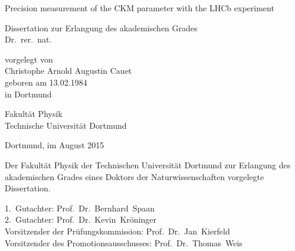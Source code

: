 
\begin{titlepage}

\vspace*{20ex}

{%
\Huge \sffamily \bfseries 
\begin{center}
  Precision measurement of the CKM parameter \sintwobetabfsf with the \acs*{LHCb} experiment
\end{center} 
}%

\begin{german}
{%
\LARGE \sffamily %
\begin{center}
  Dissertation zur Erlangung des akademischen Grades\\
  Dr.~rer.~nat.
\end{center}
}

\vspace{5ex}

{%
\Large \rmfamily
\begin{center}
  vorgelegt von \\ [0.8ex]
  Christophe Arnold Augustin Cauet \\ [0.8ex]
  geboren am 13.02.1984 \\
  in Dortmund
\end{center}
}

\vspace{5ex}

{%
\Large \rmfamily
\begin{center}
  Fakultät Physik\\
  Technische Universität Dortmund
\end{center}
}

\vspace{4ex}

{%
\Large \rmfamily
\begin{center}
  Dortmund, im August 2015
\end{center}
}

\clearpage
\thispagestyle{empty}
\vspace*{\fill}
{%
\small
  \noindent Der Fakultät Physik der Technischen Universität Dortmund zur Erlangung
  des aka\-de\-misch\-en Grades eines Doktors der Naturwissenschaften vorgelegte
  Dissertation.\\  
  
  \parbox{0.90\textwidth}{
    1.~Gutachter: Prof.~Dr.~Bernhard~Spaan \\
    2.~Gutachter: Prof.~Dr.~Kevin~Kröninger \\ [0.8ex]
    Vorsitzender der Prüfungskommission: Prof.~Dr.~Jan~Kierfeld \\ [0.8ex]
    Vorsitzender des Promotionsausschusses: Prof.~Dr.~Thomas~Weis \\ [0.8ex]
  }
}

\end{german}
\end{titlepage}


